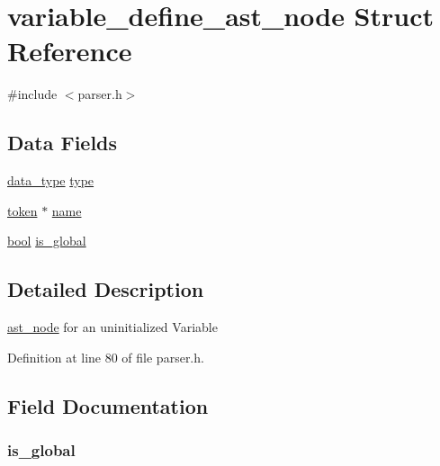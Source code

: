 \hypertarget{structvariable__define__ast__node}{\section{variable\+\_\+define\+\_\+ast\+\_\+node Struct Reference}
\label{structvariable__define__ast__node}
}


{\ttfamily \#include $<$parser.\+h$>$}

\subsection*{Data Fields}
\begin{DoxyCompactItemize}
\item 
\hyperlink{parser_8h_ac2ad7f431e3446fddcd9b6b9f93c4c14}{data\+\_\+type} \hyperlink{structvariable__define__ast__node_aa117a93354fa3056f51378be7065ce33}{type}
\item 
\hyperlink{structtoken}{token} $\ast$ \hyperlink{structvariable__define__ast__node_a0be25b04f38aae29e2dd7c1b72d4797c}{name}
\item 
\hyperlink{util_8h_af6a258d8f3ee5206d682d799316314b1}{bool} \hyperlink{structvariable__define__ast__node_a75e702abf0f7dc1348be228ab89359d5}{is\+\_\+global}
\end{DoxyCompactItemize}


\subsection{Detailed Description}
\hyperlink{structast__node}{ast\+\_\+node} for an uninitialized Variable 

Definition at line 80 of file parser.\+h.



\subsection{Field Documentation}
\hypertarget{structvariable__define__ast__node_a75e702abf0f7dc1348be228ab89359d5}{
\subsubsection[{is\+\_\+global}]{ is\+\_\+global}}\label{structvariable__define__ast__node_a75e702abf0f7dc1348be228ab89359d5}


